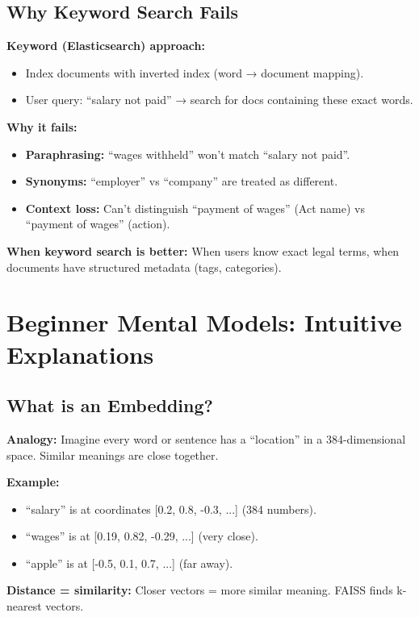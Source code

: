 \documentclass[11pt,a4paper]{article}
\begin{document}
\subsection{Why Keyword Search Fails}

\textbf{Keyword (Elasticsearch) approach:}
\begin{itemize}
\item Index documents with inverted index (word → document mapping).
\item User query: ``salary not paid'' → search for docs containing these exact words.
\end{itemize}

\textbf{Why it fails:}
\begin{itemize}
\item \textbf{Paraphrasing:} ``wages withheld'' won't match ``salary not paid''.
\item \textbf{Synonyms:} ``employer'' vs ``company'' are treated as different.
\item \textbf{Context loss:} Can't distinguish ``payment of wages'' (Act name) vs ``payment of wages'' (action).
\end{itemize}

\textbf{When keyword search is better:} When users know exact legal terms, when documents have structured metadata (tags, categories).

\section{Beginner Mental Models: Intuitive Explanations}

\subsection{What is an Embedding?}

\textbf{Analogy:} Imagine every word or sentence has a ``location'' in a 384-dimensional space. Similar meanings are close together.

\textbf{Example:}
\begin{itemize}
\item ``salary'' is at coordinates [0.2, 0.8, -0.3, ...] (384 numbers).
\item ``wages'' is at [0.19, 0.82, -0.29, ...] (very close).
\item ``apple'' is at [-0.5, 0.1, 0.7, ...] (far away).
\end{itemize}

\textbf{Distance = similarity:} Closer vectors = more similar meaning. FAISS finds k-nearest vectors.
\end{document}
